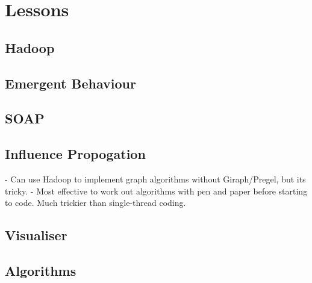 \section{Lessons}


\subsection{Hadoop}

\subsection{Emergent Behaviour}

\subsection{SOAP}

\subsection{Influence Propogation}

- Can use Hadoop to implement graph algorithms without Giraph/Pregel, but its tricky.
- Most effective to work out algorithms with pen and paper before starting to code. Much trickier than single-thread coding.

\subsection{Visualiser}

\subsection{Algorithms}

